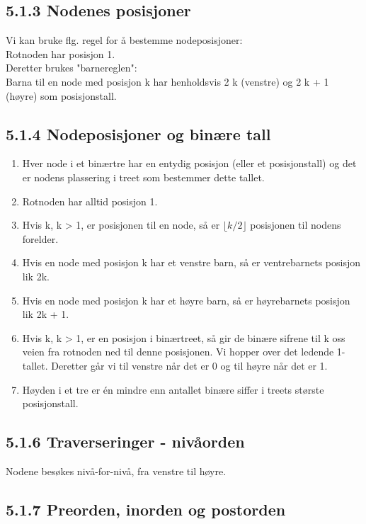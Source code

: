 \documentclass[11pt]{article}
\begin{document}
    \subsection{5.1.3 Nodenes posisjoner}
    Vi kan bruke flg. regel for å bestemme nodeposisjoner:\\
    Rotnoden har posisjon 1.\\
    Deretter brukes "barnereglen": \\
    Barna til en node med posisjon k har henholdsvis 2 k
    (venstre) og 2 k + 1 (høyre) som posisjonstall.

    \subsection{5.1.4 Nodeposisjoner og binære tall}
        \begin{enumerate}
            \item Hver node i et binærtre har en entydig posisjon (eller et posisjonstall) og det er nodens
                plassering i treet som bestemmer dette tallet.
            \item Rotnoden har alltid posisjon 1.
            \item Hvis k, k > 1, er posisjonen til en node, så er $\lfloor k/2 \rfloor$ posisjonen til nodens forelder.
            \item Hvis en node med posisjon k har et venstre barn, så er ventrebarnets posisjon lik 2k.
            \item Hvis en node med posisjon k har et høyre barn, så er høyrebarnets posisjon lik 2k + 1.
            \item Hvis k, k > 1, er en posisjon i binærtreet, så gir de binære sifrene til k oss veien fra
                rotnoden ned til denne posisjonen. Vi hopper over det ledende 1-tallet. Deretter går vi
                til venstre når det er 0 og til høyre når det er 1.
            \item Høyden i et tre er én mindre enn antallet binære siffer i treets største posisjonstall.
        \end{enumerate}

    \subsection{5.1.6 Traverseringer - nivåorden}
        Nodene besøkes nivå-for-nivå, fra venstre til høyre.

    \subsection{5.1.7 Preorden, inorden og postorden}
\end{document}
